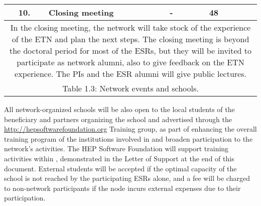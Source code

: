 \begin{center}
\begin{tabular}{@{}|c|p{45mm}|p{7mm}|p{30mm}|p{15mm}|p{45mm}|@{}}
				\cellcolor{red!70!black} 10. & \textbf{Closing meeting} & - & \heidelbergentity & 48  \tabularnewline\midrule
				\multicolumn{6}{|p{0.975\textwidth}|}{					
In the closing meeting, the network will take stock of the experience of the ETN and plan the next steps. 
The closing meeting is beyond the doctoral period for most of the ESRs, but they will be invited to participate as network alumni, also to give feedback on the ETN experience. 
The PIs and the ESR alumni will give public lectures. 
				} \tabularnewline \hline %
			
				\multicolumn{6}{|p{0.975\textwidth}|}{
				Table 1.3: Network events and schools.  
				}		
	
			\end{tabular}

\end{center}


All network-organized schools will be also open to the local students of the beneficiary and partners organizing the school and advertised through the \href{HEP Software Foundation}{http://hepsoftwarefoundation.org} Training group, as part of enhancing the overall training program of the institutions involved in \acronym and broaden participation to the network's activities. 
The HEP Software Foundation will support training activities within \acronym, demonstrated in the Letter of Support at the end of this document. 
External students will be accepted if the optimal capacity of the school is not reached by the participating ESRs alone, and a fee will be charged to non-network participants if the node incurs external expenses due to their participation. 

	
